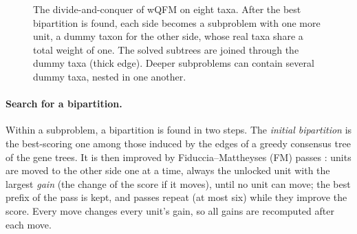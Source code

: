 \documentclass[11pt,a4paper]{article}
\begin{document}
\begin{figure}[t]
\caption{The divide-and-conquer of wQFM on eight taxa. After the best bipartition is found, each
side becomes a subproblem with one more unit, a dummy taxon for the other side, whose real taxa
share a total weight of one. The solved subtrees are joined through the dummy taxa (thick edge).
Deeper subproblems can contain several dummy taxa, nested in one another.}
\label{fig:dc}
\end{figure}

\paragraph{Search for a bipartition.} Within a subproblem, a bipartition is found in two steps.
The \emph{initial bipartition} is the best-scoring one among those induced by the edges of a
greedy consensus tree of the gene trees. It is then improved by Fiduccia--Mattheyses (FM) passes
\citep{fiduccia1982}: units are moved to the other side one at a time, always the unlocked unit with
the largest \emph{gain} (the change of the score if it moves), until no unit can move; the best prefix
of the pass is kept, and passes repeat (at most six) while they improve the score. Every move
changes every unit's gain, so all gains are recomputed after each move.
\end{document}
